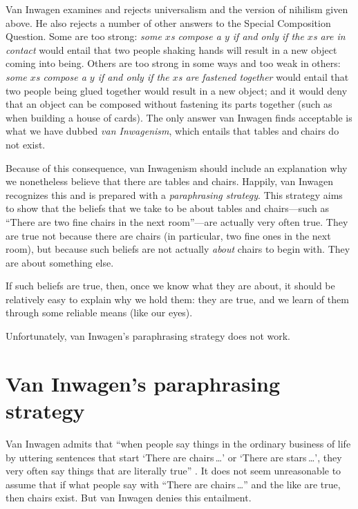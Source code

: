 \documentclass[12pt,twoside]{reedfancy}
\begin{document}
\begin{spacing}{1.25}
Van Inwagen examines and rejects universalism and the version of
nihilism given above.  He also rejects a number of other answers to
the Special Composition Question.  Some are too strong: {\em some $x$s
  compose a $y$ if and only if the $x$s are in contact} would entail
that two people shaking hands will result in a new object coming into
being.  Others are too strong in some ways and too weak in others:
{\em some $x$s compose a $y$ if and only if the $x$s are fastened
  together} would entail that two people being glued together would
result in a new object; and it would deny that an object can be
composed without fastening its parts together (such as when building a
house of cards).  The only answer van Inwagen finds acceptable is what
we have dubbed {\em van Inwagenism}, which entails that tables and
chairs do not exist.

Because of this consequence, van Inwagenism should include an
explanation why we nonetheless believe that there are tables and
chairs.  Happily, van Inwagen recognizes this and is prepared with a
{\em paraphrasing strategy}.  This strategy aims to show that the
beliefs that we take to be about tables and chairs---such as ``There
are two fine chairs in the next room''---are actually very often true.
They are true not because there are chairs (in particular, two fine
ones in the next room), but because such beliefs are not actually {\em
  about} chairs to begin with.  They are about something else.

If such beliefs are true, then, once we know what they are about, it
should be relatively easy to explain why we hold them: they are true,
and we learn of them through some reliable means (like our eyes).

Unfortunately, van Inwagen's paraphrasing strategy does not work.

\section{Van Inwagen's paraphrasing strategy}
\label{i-para}
Van Inwagen admits that ``when people say things in the ordinary
business of life by uttering sentences that start `There are
chairs\,\ldots ' or `There are stars\,\ldots ', they very often say
things that are literally true'' \cite[102]{inwagen1995}.  It does not
seem unreasonable to assume that if what people say with ``There are
chairs\,\ldots '' and the like are true, then chairs exist.  But van
Inwagen denies this entailment.


\end{spacing}
\end{document}
